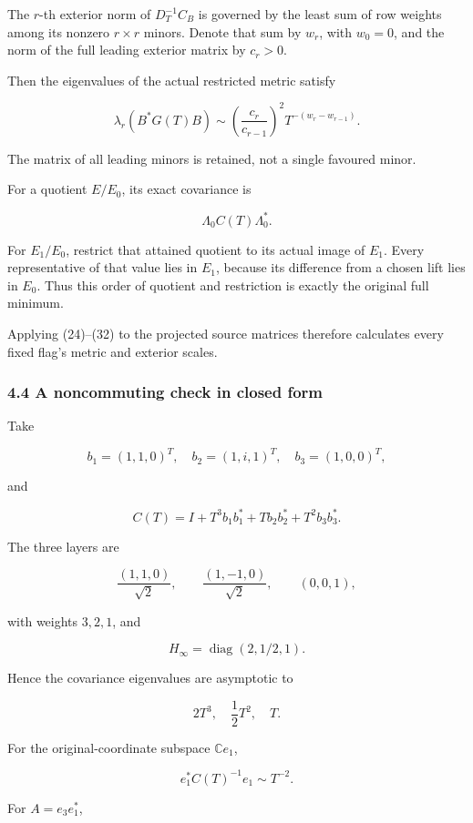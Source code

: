 \documentclass[11pt]{article}
\begin{document}
The \(r\)-th exterior norm of \(D_T^{-1}C_B\) is governed by the least sum of row weights among its nonzero \(r\times r\) minors. Denote that sum by \(w_r\), with \(w_0=0\), and the norm of the full leading exterior matrix by \(c_r>0\).

Then the eigenvalues of the actual restricted metric satisfy

\[
\boxed{
\lambda_r(B^*G(T)B)
\sim
\left(\frac{c_r}{c_{r-1}}\right)^2
T^{-(w_r-w_{r-1})}.
}
\tag{32}
\]

The matrix of all leading minors is retained, not a single favoured minor.

For a quotient \(E/E_0\), its exact covariance is

\[
\Lambda_0C(T)\Lambda_0^*.
\]

For \(E_1/E_0\), restrict that attained quotient to its actual image of \(E_1\). Every representative of that value lies in \(E_1\), because its difference from a chosen lift lies in \(E_0\). Thus this order of quotient and restriction is exactly the original full minimum.

Applying (24)--(32) to the projected source matrices therefore calculates every fixed flag's metric and exterior scales.

\subsubsection{4.4 A noncommuting check in closed form}\label{a-noncommuting-check-in-closed-form}

Take

\[
b_1=(1,1,0)^T,\quad
b_2=(1,i,1)^T,\quad
b_3=(1,0,0)^T,
\]

and

\[
C(T)=I+T^3b_1b_1^*+Tb_2b_2^*+T^2b_3b_3^*.
\]

The three layers are

\[
\frac{(1,1,0)}{\sqrt2},\qquad
\frac{(1,-1,0)}{\sqrt2},\qquad
(0,0,1),
\]

with weights \(3,2,1\), and

\[
H_\infty=\operatorname{diag}(2,1/2,1).
\]

Hence the covariance eigenvalues are asymptotic to

\[
2T^3,\quad \frac12T^2,\quad T.
\]

For the original-coordinate subspace \(\mathbb Ce_1\),

\[
e_1^*C(T)^{-1}e_1\sim T^{-2}.
\]

For \(A=e_3e_1^*\),
\end{document}
